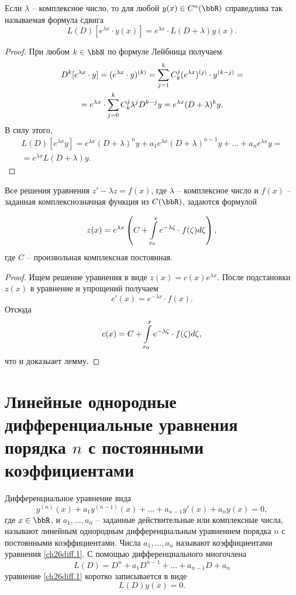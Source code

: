 \begin{lemm} \label{ch26lemm1.2}
Если $\lambda$ -- комплексное число, то для любой $y(x)\in C^n(\bbR)$ справедлива так называемая формула сдвига
$$
L(D)\left[e^{\lambda x}\cdot y(x)\right]=e^{\lambda x}\cdot L(D+\lambda)y(x).
$$
\end{lemm}
\begin{proof}
При любом $k\in \bbN$ по формуле Лейбница получаем
\begin{multline*}
D^k[e^{\lambda x}\cdot y]=(e^{\lambda x}\cdot y)^{(k)}=\sum_{j=1}^{k}\limits C_k^j(e^{\lambda x})^{(j)}\cdot y^{(k-j)}=\\=e^{\lambda x}\cdot \sum_{j=0}^{k}\limits C_k^j\lambda^jD^{k-j}y=e^{\lambda x}(D+\lambda)^ky.
\end{multline*}
В силу этого,
\begin{multline*}
L(D)[e^{\lambda x}y]=e^{\lambda x}(D+\lambda)^ny+a_1e^{\lambda x}(D+\lambda)^{n-1}y+...+a_ne^{\lambda x}y=\\=e^{\lambda x}L(D+\lambda)y.
\end{multline*}
\end{proof}

\begin{lemm} \label{ch26lemm1.3}
Все решения уравнения $z'-\lambda z = f(x)$, где $\lambda$ -- комплексное число и $f(x)$ -- заданная комплекснозначная функция из $C(\bbR)$, задаются формулой
	
$$
z(x)=e^{\lambda x}\left(C+ \int_{x_0}^{x}\limits e^{-\lambda\zeta}\cdot f(\zeta)d\zeta\right),
$$
где $C$ -- произвольная комплексная постоянная. 
\end{lemm}

\begin{proof}
Ищем решение уравнения в виде $z(x)=c(x)e^{\lambda x}$. После подстановки $z(x)$ в уравнение и упрощений получаем 
$$
c'(x)=e^{-\lambda x}\cdot f(x).
$$
Отсюда
$$
c(x)=C+\int_{x_0}^{x}\limits e^{-\lambda\zeta}\cdot f(\zeta)d\zeta,
$$
что и доказыает лемму.
\end{proof}

\section{Линейные однородные дифференциальные уравнения порядка $n$ с постоянными коэффициентами}

Дифференциальное уравнение вида
\begin{equation}\label{ch26diff.1}
y^{(n)}(x)+a_1y^{(n-1)}(x)+\dots+a_{n-1}y'(x)+a_ny(x)=0,
\end{equation}
где $x\in \bbR$, и $a_1,\dots,a_n$ -- заданные действительные или комплексные числа, называют линейным однородным дифференциальным уравнением порядка $n$ с постоянными коэффициентами. Числа $a_1,\dots,a_n$ называют коэффициентами уравнения \eqref{ch26diff.1}.
С помощью дифференциального многочлена 
$$
L(D)= D^n+a_1D^{n-1}+\dots+a_{n-1}D+a_n
$$
уравнение \eqref{ch26diff.1} коротко записывается в виде
\begin{equation} \label{ch26diff.2}
L(D)y(x)=0.
\end{equation} 

